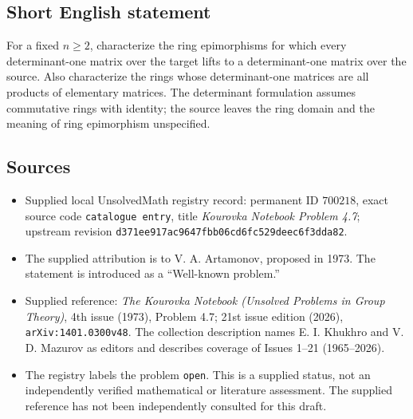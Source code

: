 \documentclass[11pt]{article}
\begin{document}
\subsection{Short English statement}
For a fixed \(n\geq2\), characterize the ring epimorphisms for which every determinant-one matrix over the target lifts to a determinant-one matrix over the source. Also characterize the rings whose determinant-one matrices are all products of elementary matrices. The determinant formulation assumes commutative rings with identity; the source leaves the ring domain and the meaning of ring epimorphism unspecified.
\subsection{Sources}
\begin{itemize}
\item Supplied local UnsolvedMath registry record: permanent ID \(700218\), exact source code \texttt{catalogue entry}, title \emph{Kourovka Notebook Problem 4.7}; upstream revision \texttt{d371ee917ac9647fbb06cd6fc529deec6f3dda82}.
\item The supplied attribution is to V. A. Artamonov, proposed in 1973. The statement is introduced as a ``Well-known problem.''
\item Supplied reference: \emph{The Kourovka Notebook (Unsolved Problems in Group Theory)}, 4th issue (1973), Problem 4.7; 21st issue edition (2026), \texttt{arXiv:1401.0300v48}. The collection description names E. I. Khukhro and V. D. Mazurov as editors and describes coverage of Issues 1--21 (1965--2026).
\item The registry labels the problem \texttt{open}. This is a supplied status, not an independently verified mathematical or literature assessment. The supplied reference has not been independently consulted for this draft.
\end{itemize}
\end{document}
